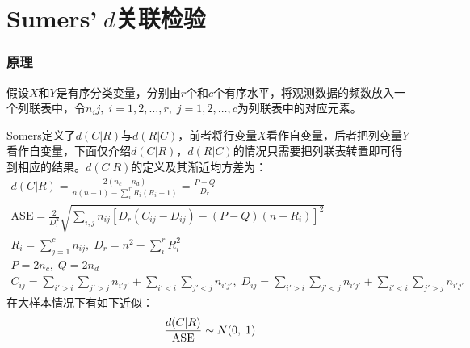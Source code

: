 \section{Sumers'$\;d$关联检验}
\subsubsection{原理}
假设$X$和$Y$是有序分类变量，分别由$r$个和$c$个有序水平，将观测数据的频数放入一个列联表中，令$n_ij,\;i=1,2,\dots,r,\;j=1,2,\dots,c$为列联表中的对应元素。\par
Somers定义了$d(C|R)$与$d(R|C)$，前者将行变量$X$看作自变量，后者把列变量$Y$看作自变量，下面仅介绍$d(C|R)$，$d(R|C)$的情况只需要把列联表转置即可得到相应的结果。$d(C|R)$的定义及其渐近均方差为：
\begin{gather*}
	d(C|R)=\frac{2(n_c-n_d)}{n(n-1)-\sum_i^rR_i(R_i-1)}=\frac{P-Q}{D_r} \\
	\text{ASE}=\frac{2}{D_r^2}\sqrt{\sum_{i,j}n_{ij}\left[D_r(C_{ij}-D_{ij})-(P-Q)(n-R_i)\right]^2} \\
	R_i=\sum_{j=1}^c{n_{ij}},\;D_r=n^2-\sum_i^rR_i^2 \\
	P=2n_c,\;Q=2n_d \\
	C_{ij}=\sum_{i'>i}\sum_{j'>j}n_{i'j'}+\sum_{i'<i}\sum_{j'<j}n_{i'j'},\;D_{ij}=\sum_{i'>i}\sum_{j'<j}n_{i'j'}+\sum_{i'<i}\sum_{j'>j}n_{i'j'}
\end{gather*}
在大样本情况下有如下近似：
\begin{equation}
	\frac{d(C|R)}{\text{ASE}}\sim N(0,\;1)\notag
\end{equation}